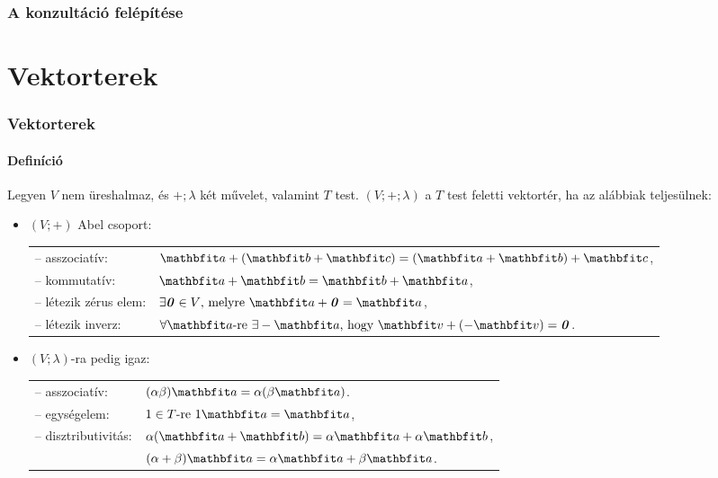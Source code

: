 \documentclass[xcolor={table}]{beamer}
\institute{Mechatronika szakosztály}
\begin{document}
\frame{\titlepage}

\begin{frame}
  \frametitle{A konzultáció felépítése}
  \framesubtitle{\;}
  \tableofcontents
\end{frame}

\section{Vektorterek}
\begin{frame}
  \frametitle{Vektorterek}
  \framesubtitle{Definíció}

  Legyen $V$ nem üreshalmaz, és $+; \lambda$ két művelet, valamint $T$ test.
  $(V; +; \lambda)$ a $T$ test feletti vektortér, ha az alábbiak teljesülnek:
  \begin{itemize}
    \def\arraystretch{1.2}
    \item $(V; +)$ Abel csoport:\\[1mm]
          \begin{tabular}{p{35mm} l}
            -- asszociatív:        &
            $\rvec a + (\rvec b + \rvec c) = (\rvec a + \rvec b) + \rvec c$,
            \\
            -- kommutatív:         &
            $\rvec a + \rvec b = \rvec b + \rvec a$,
            \\
            -- létezik zérus elem: &
            $\exists \nvec \in V \text{, melyre } \rvec a + \nvec = \rvec a$,
            \\
            -- létezik inverz:     &
            $\forall \rvec a \text{-re } \exists - \rvec a \text{, hogy } \rvec v + (- \rvec v) = \nvec$.
          \end{tabular}
    \item $(V; \lambda)$-ra pedig igaz:\\[1mm]
          \begin{tabular}{p{35mm} l}
            -- asszociatív:      & $(\alpha \beta) \rvec a = \alpha (\beta \rvec a)$.
            \\
            -- egységelem:       & $1 \in T \text{-re } 1\rvec a = \rvec a$,
            \\
            -- disztributivitás: & $\alpha(\rvec a + \rvec b) = \alpha \rvec a + \alpha \rvec b$,
            \\
                                 & $(\alpha + \beta) \rvec a = \alpha \rvec a + \beta \rvec a$.
          \end{tabular}
  \end{itemize}
\end{frame}
\end{document}
